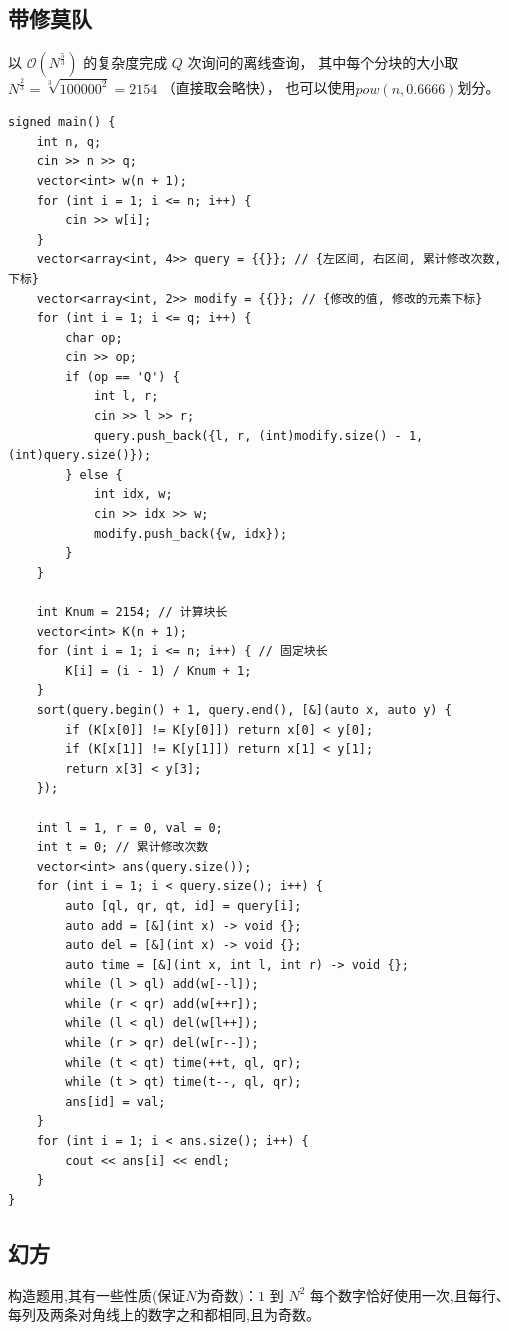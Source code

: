 \subsection{带修莫队}
以 $\mathcal O(N^\frac{5}{3})$ 的复杂度完成 $Q$ 次询问的离线查询，
其中每个分块的大小取 $N^\frac{2}{3}=\sqrt[3]{100000^2}=2154$ （直接取会略快），
也可以使用$pow(n, 0.6666)$划分。
\begin{lstlisting}[caption={}]
signed main() {
    int n, q;
    cin >> n >> q;
    vector<int> w(n + 1);
    for (int i = 1; i <= n; i++) {
        cin >> w[i];
    }
    vector<array<int, 4>> query = {{}}; // {左区间, 右区间, 累计修改次数, 下标}
    vector<array<int, 2>> modify = {{}}; // {修改的值, 修改的元素下标}
    for (int i = 1; i <= q; i++) {
        char op;
        cin >> op;
        if (op == 'Q') {
            int l, r;
            cin >> l >> r;
            query.push_back({l, r, (int)modify.size() - 1, (int)query.size()});
        } else {
            int idx, w;
            cin >> idx >> w;
            modify.push_back({w, idx});
        }
    }
    
    int Knum = 2154; // 计算块长
    vector<int> K(n + 1);
    for (int i = 1; i <= n; i++) { // 固定块长
        K[i] = (i - 1) / Knum + 1;
    }
    sort(query.begin() + 1, query.end(), [&](auto x, auto y) {
        if (K[x[0]] != K[y[0]]) return x[0] < y[0];
        if (K[x[1]] != K[y[1]]) return x[1] < y[1];
        return x[3] < y[3];
    });
    
    int l = 1, r = 0, val = 0;
    int t = 0; // 累计修改次数
    vector<int> ans(query.size());
    for (int i = 1; i < query.size(); i++) {
        auto [ql, qr, qt, id] = query[i];
        auto add = [&](int x) -> void {};
        auto del = [&](int x) -> void {};
        auto time = [&](int x, int l, int r) -> void {};
        while (l > ql) add(w[--l]);
        while (r < qr) add(w[++r]);
        while (l < ql) del(w[l++]);
        while (r > qr) del(w[r--]);
        while (t < qt) time(++t, ql, qr);
        while (t > qt) time(t--, ql, qr);
        ans[id] = val;
    }
    for (int i = 1; i < ans.size(); i++) {
        cout << ans[i] << endl;
    }
}
\end{lstlisting}

\subsection{幻方}
构造题用,其有一些性质(保证$N$为奇数)：$1$ 到 $N^2$
每个数字恰好使用一次,且每行、每列及两条对角线上的数字之和都相同,且为奇数。

